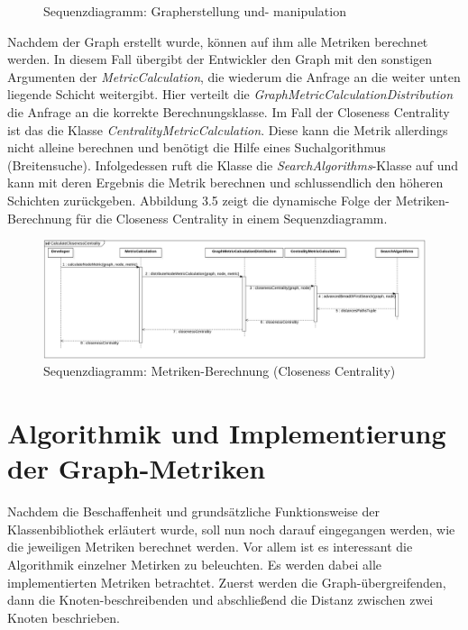 \documentclass[a4paper,12pt,ngerman,chapterprefix=false,listof=totoc,bibliography=totoc]{scrreprt}
\begin{document}
{{{\begin{figure}[ht!]
	\caption[Sequenzdiagramm: Grapherstellung und- manipulation]{Sequenzdiagramm: Grapherstellung und- manipulation}
\end{figure}
Nachdem der Graph erstellt wurde, können auf ihm alle Metriken berechnet werden. In diesem Fall übergibt der Entwickler den Graph mit den sonstigen Argumenten der \textit{MetricCalculation}, die wiederum die Anfrage an die weiter unten liegende Schicht weitergibt. Hier verteilt die \textit{GraphMetricCalculationDistribution} die Anfrage an die korrekte Berechnungsklasse. Im Fall der Closeness Centrality ist das die Klasse \textit{CentralityMetricCalculation}. Diese kann die Metrik allerdings nicht alleine berechnen und benötigt die Hilfe eines Suchalgorithmus (Breitensuche). Infolgedessen ruft die Klasse die \textit{SearchAlgorithms}-Klasse auf und kann mit deren Ergebnis die Metrik berechnen und schlussendlich den höheren Schichten zurückgeben. Abbildung 3.5 zeigt die dynamische Folge der Metriken-Berechnung für die Closeness Centrality in einem Sequenzdiagramm.
\begin{figure}[ht!]
	\centering
	\includegraphics[scale=.22]{Abbildungen/UML/sequence_metric_calc.png}
	\caption[Sequenzdiagramm: Metriken-Berechnung (Closeness Centrality)]{Sequenzdiagramm: Metriken-Berechnung (Closeness Centrality)}
\end{figure}
}
\section{Algorithmik und Implementierung der Graph-Metriken}
{
Nachdem die Beschaffenheit und grundsätzliche Funktionsweise der Klassenbibliothek erläutert wurde, soll nun noch darauf eingegangen werden, wie die jeweiligen Metriken berechnet werden. Vor allem ist es interessant die Algorithmik einzelner Metirken zu beleuchten. Es werden dabei alle implementierten Metriken betrachtet. Zuerst werden die Graph-übergreifenden, dann die Knoten-beschreibenden und abschließend die Distanz zwischen zwei Knoten beschrieben.
}
}}
\end{document}
